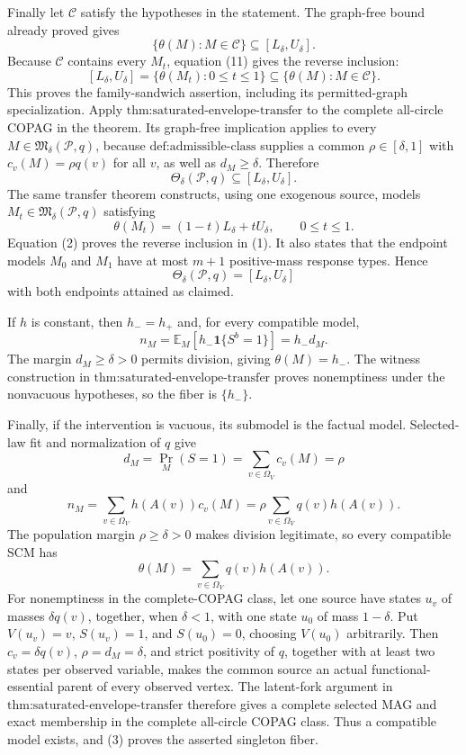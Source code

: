 Finally let \(\mathscr C\) satisfy the hypotheses in the statement.  The graph-free bound already proved gives
\[
\{\theta(M):M\in\mathscr C\}\subseteq[L_\delta,U_\delta].
\]
Because \(\mathscr C\) contains every \(M_t\), equation (11) gives the reverse inclusion:
\[
[L_\delta,U_\delta]
=\{\theta(M_t):0\leq t\leq1\}
\subseteq\{\theta(M):M\in\mathscr C\}.
\]
This proves the family-sandwich assertion, including its permitted-graph specialization.
Apply \(\text{thm:saturated-envelope-transfer}\) to the complete all-circle COPAG in the theorem.  Its graph-free implication applies to every \(M\in\mathfrak M_\delta(\mathcal P,q)\), because \(\text{def:admissible-class}\) supplies a common \(\rho\in[\delta,1]\) with \(c_v(M)=\rho q(v)\) for all \(v\), as well as \(d_M\geq\delta\).  Therefore
\[
\Theta_\delta(\mathcal P,q)\subseteq[L_\delta,U_\delta]. \tag{1}
\]
The same transfer theorem constructs, using one exogenous source, models \(M_t\in\mathfrak M_\delta(\mathcal P,q)\) satisfying
\[
\theta(M_t)=(1-t)L_\delta+tU_\delta,
\qquad 0\leq t\leq1. \tag{2}
\]
Equation (2) proves the reverse inclusion in (1).  It also states that the endpoint models \(M_0\) and \(M_1\) have at most \(m+1\) positive-mass response types.  Hence
\[
\Theta_\delta(\mathcal P,q)=[L_\delta,U_\delta]
\]
with both endpoints attained as claimed.

If \(h\) is constant, then \(h_-=h_+\) and, for every compatible model,
\[
n_M=\mathbb E_M\!\left[h_-\mathbf 1\{S^b=1\}\right]=h_-d_M.
\]
The margin \(d_M\geq\delta>0\) permits division, giving \(\theta(M)=h_-\).  The witness construction in \(\text{thm:saturated-envelope-transfer}\) proves nonemptiness under the nonvacuous hypotheses, so the fiber is \(\{h_-\}\).

Finally, if the intervention is vacuous, its submodel is the factual model.  Selected-law fit and normalization of \(q\) give
\[
d_M=\Pr_M(S=1)=\sum_{v\in\Omega_V}c_v(M)=\rho
\]
and
\[
n_M=\sum_{v\in\Omega_V}h(A(v))c_v(M)
=\rho\sum_{v\in\Omega_V}q(v)h(A(v)).
\]
The population margin \(\rho\geq\delta>0\) makes division legitimate, so every compatible SCM has
\[
\theta(M)=\sum_{v\in\Omega_V}q(v)h(A(v)). \tag{3}
\]
For nonemptiness in the complete-COPAG class, let one source have states \(u_v\) of masses \(\delta q(v)\), together, when \(\delta<1\), with one state \(u_0\) of mass \(1-\delta\).  Put \(V(u_v)=v\), \(S(u_v)=1\), and \(S(u_0)=0\), choosing \(V(u_0)\) arbitrarily.  Then \(c_v=\delta q(v)\), \(\rho=d_M=\delta\), and strict positivity of \(q\), together with at least two states per observed variable, makes the common source an actual functional-essential parent of every observed vertex.  The latent-fork argument in \(\text{thm:saturated-envelope-transfer}\) therefore gives a complete selected MAG and exact membership in the complete all-circle COPAG class.  Thus a compatible model exists, and (3) proves the asserted singleton fiber.
